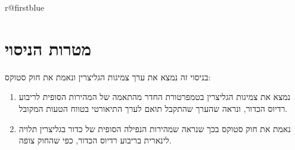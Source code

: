 \documentclass[10pt,a4paper]{article}
\newif\ifreview \reviewtrue
\begin{document}
\ifreview\ifcsname r@firstblue\endcsname
\fi\fi

\setcounter{page}{1}

\section*{מטרות הניסוי}
בניסוי זה נמצא את ערך צמיגות הגליצרין ונאמת את חוק סטוקס:
\begin{enumerate}
  \item נמצא את צמיגות הגליצרין בטמפרטורת החדר מהתאמה של המהירות הסופית לריבוע רדיוס הכדור, ונראה שהערך שהתקבל תואם לערך התיאורטי בטווח הטעות המקובל.
  \item נאמת את חוק סטוקס בכך שנראה שמהירות הנפילה הסופית של כדור בגליצרין תלויה לינארית בריבוע רדיוס הכדור, כפי שהחוק צופה.
\end{enumerate}
\end{document}
